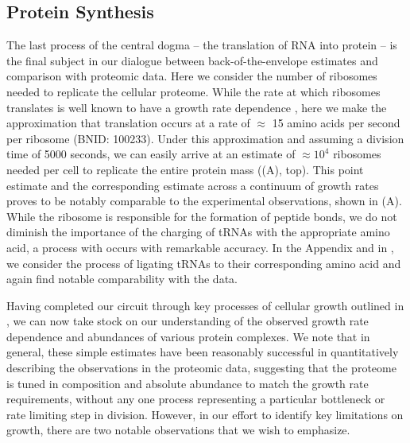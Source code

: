 \subsection{Protein Synthesis}
The last process of the central dogma -- the translation of RNA into protein
-- is the final subject in our dialogue between back-of-the-envelope
estimates and comparison with proteomic data. Here we consider the number of
ribosomes needed to replicate the cellular proteome. While the rate at which
ribosomes translates is well known to have a growth rate dependence
\citep{dai2018}, here we make the approximation that translation occurs at a
rate of $\approx$ 15 amino acids per second per ribosome (BNID: 100233).
Under this approximation and assuming a division time of 5000 seconds, we can
easily arrive at an estimate of $\approx 10^4$ ribosomes needed per cell to
replicate the entire protein mass ((A), top). This point
estimate and the corresponding estimate across a continuum of growth rates
proves to be notably comparable to the experimental observations, shown in
(A). While the ribosome is responsible for the
formation of peptide bonds, we do not diminish the importance of the charging
of tRNAs with the appropriate amino acid, a process with occurs with
remarkable accuracy. In the Appendix and in
, we consider the process of ligating tRNAs
to their corresponding amino acid and again find notable comparability with
the data.

Having completed our circuit through key processes of cellular growth
outlined in , we can now take stock on our understanding of the
observed growth rate dependence and abundances of various protein complexes. We
note that in general, these simple estimates have been reasonably successful in
quantitatively describing the observations in the proteomic data, suggesting
that the proteome is tuned in composition and absolute abundance to match the
growth rate requirements, without any one process representing a particular
bottleneck or rate limiting step in division. However, in our effort to identify
key limitations on growth, there are two notable observations that we wish to
emphasize.

